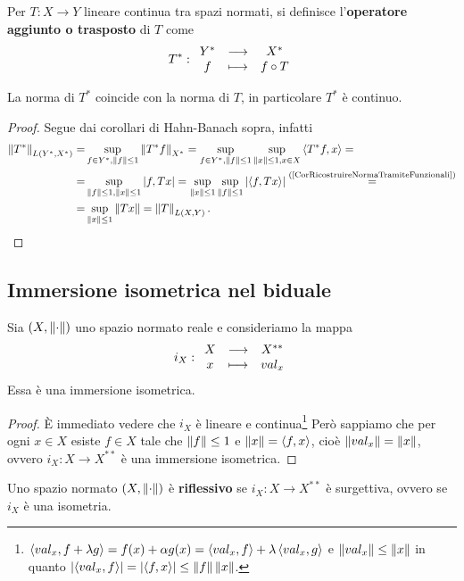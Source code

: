 \begin{definition}
Per $T:X\to Y$ lineare continua tra spazi normati, si definisce l'\textbf{operatore aggiunto o trasposto} di $T$ come
\[T^\ast:\funcDef{Y^\ast}{X^\ast}{f}{f\circ T}\]
\end{definition}

\begin{proposition}
La norma di $T^\ast$ coincide con la norma di $T$, in particolare $T^\ast$ \`e continuo.
\end{proposition}
\begin{proof}
Segue dai corollari di Hahn-Banach sopra, infatti
\begin{align*}
    \norm{T^\ast}_{L(Y^\ast,X^\ast)}=&\sup_{f\in Y^\ast,\norm f\leq 1}\norm{T^\ast f}_{X^\ast}=\sup_{f\in Y^\ast,\norm f\leq 1}\sup_{\norm x\leq 1,x\in X}\ps{T^\ast f,x}=\\
    =&\sup_{\norm f\leq 1,\norm x\leq 1}\abs{f,Tx}=\sup_{\norm x\leq 1}\sup_{\norm f\leq 1}\abs{\ps{f,Tx}}\pasgnl={(\ref{CorRicostruireNormaTramiteFunzionali})}\\
    =&\sup_{\norm x\leq 1}\norm{Tx}=\norm T_{L(X,Y)}.
\end{align*}
\end{proof}


\subsection{Immersione isometrica nel biduale}
\begin{proposition}\label{PrImmersioneIsometricaNelBiduale}
Sia $(X,\normd)$ uno spazio normato reale e consideriamo la mappa
\[i_X:\funcDef{X}{X^{\ast\ast}}{x}{val_x}\]
Essa \`e una immersione isometrica.
\end{proposition}
\begin{proof}
\`E immediato vedere che $i_X$ \`e lineare e continua\footnote{$\ps{val_x,f+\la g}=f(x)+\al g(x)=\ps{val_x,f}+\la\ps{val_x,g}$ e $\norm{val_x}\leq \norm x$ in quanto $\abs{\ps{val_x,f}}=\abs{\ps{f,x}}\leq \norm f\norm x$.} Per\`o sappiamo che per ogni $x\in X$ esiste $f\in X$ tale che $\norm f\leq 1$ e $\norm x=\ps{f,x}$, cio\`e $\norm{val_x}=\norm x$, ovvero $i_X:X\to X^{\ast\ast}$ \`e una immersione isometrica.
\end{proof}

\begin{definition}
Uno spazio normato $(X,\normd)$ \`e \textbf{riflessivo} se $i_X:X\to X^{\ast\ast}$ \`e surgettiva, ovvero se $i_X$ \`e una isometria.
\end{definition}

